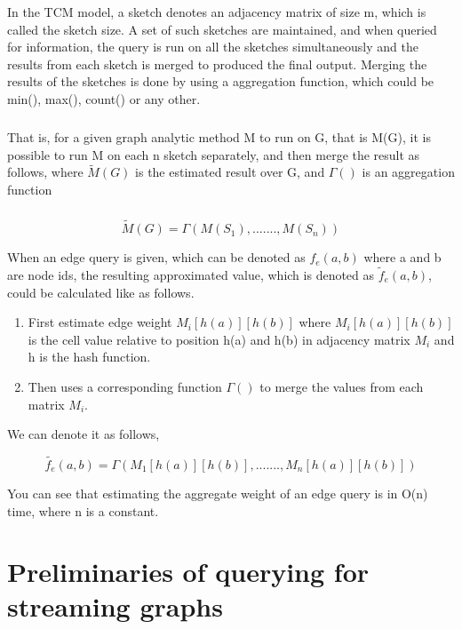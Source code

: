 \documentclass[12pt]{report}
\numberwithin{figure}{section}
\numberwithin{table}{section}
\begin{document}
In the TCM model, a sketch denotes an adjacency matrix of size m, which is called the sketch size. A set of such sketches are maintained, and when queried for information, the query is run on all the sketches simultaneously and the results from each sketch is merged to produced the final output. Merging the results of the sketches is done by using a aggregation function, which could be min(), max(), count() or any other. 

\paragraph{}

That is, for a given graph analytic method M to run on G, that is M(G), it is possible to run M on each n sketch separately, and then merge the result as follows, where $\tilde{M}(G)$ is the estimated result over G, and $\Gamma()$ is an aggregation function 

\paragraph{}

\begin{equation}
\tilde{M}(G) = \Gamma(M(S_1), ......., M(S_n))
\end{equation}

When an edge query is given, which can be denoted as $f_e(a,b)$ where a and b are node ids, the resulting approximated value, which is denoted as $\tilde{f}_e(a,b)$, could be calculated like as follows.

\begin{enumerate}
\item First  estimate edge weight $M_i[h(a)][h(b)] $ where $M_i[h(a)][h(b)]$ is the cell value relative to position h(a) and h(b) in adjacency matrix $M_i$ and h is the hash function.
\item Then uses a corresponding function $\Gamma()$ to merge the values from each matrix $M_i$.
\end{enumerate}
 
We can denote it as follows, 

\begin{equation}
\tilde{f_e}(a,b) = \Gamma(M_1[h(a)][h(b)], ......., M_n[h(a)][h(b)])
\end{equation}

You can see that estimating the aggregate weight of an edge query is in O(n) time, where n is a constant.


\chapter{Preliminaries of querying for streaming graphs}
\end{document}
